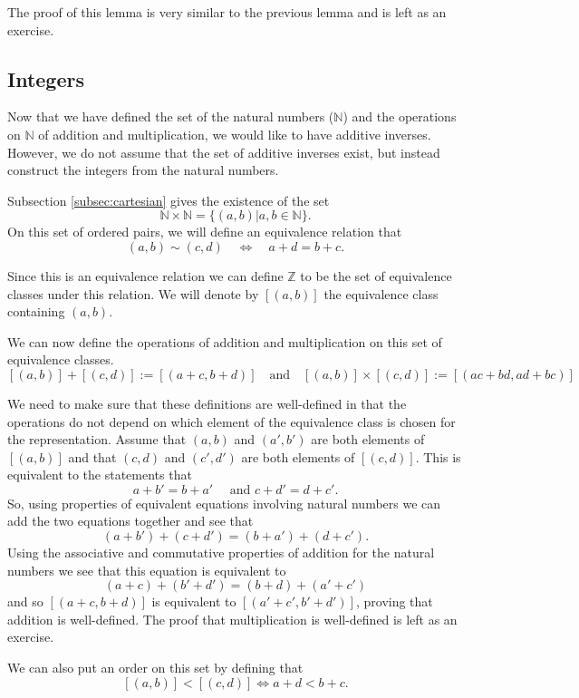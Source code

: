 \documentclass[
]{book}
\theoremstyle{definition}
\theoremstyle{definition}
\theoremstyle{definition}
\theoremstyle{remark}
\begin{document}
The proof of this lemma is very similar to the previous lemma and is left as an exercise.

\hypertarget{integers}{%
\subsection{Integers}\label{integers}}

Now that we have defined the set of the natural numbers (\(\mathbb{N}\)) and the operations on \(\mathbb{N}\) of addition and multiplication, we would like to have additive inverses. However, we do not assume that the set of additive inverses exist, but instead construct the integers from the natural numbers.

Subsection \ref{subsec:cartesian} gives the existence of the set \[\mathbb{N}\times \mathbb{N} = \{ (a,b)  \vert a,b \in \mathbb{N}\}.\] On this set of ordered pairs, we will define an equivalence relation that
\[(a,b)\sim (c,d) \quad \Leftrightarrow \quad  a+d=b+c.\]

Since this is an equivalence relation we can define \(\mathbb{Z}\) to be the set of equivalence classes under this relation. We will denote by \([(a,b)]\) the equivalence class containing \((a,b)\).

We can now define the operations of addition and multiplication on this set of equivalence classes.
\[[(a,b)]+[(c,d)]:= [(a+c,b+d)] \quad \mbox{and} \quad [(a,b)]\times [(c,d)] := [(ac+bd,ad+bc)]\]

We need to make sure that these definitions are well-defined in that the operations do not depend on which element of the equivalence class is chosen for the representation. Assume that \((a,b)\) and \((a',b')\) are both elements of \([(a,b)]\) and that \((c,d)\) and \((c',d')\) are both elements of \([(c,d)]\). This is equivalent to the statements that \[a+b'=b+a' \quad \mbox{ and } c+d'=d+c'.\] So, using properties of equivalent equations involving natural numbers we can add the two equations together and see that \[(a+b') + (c+d') = (b+a')+(d+c').\] Using the associative and commutative properties of addition for the natural numbers we see that this equation is equivalent to \[(a+c) + (b'+d') = (b+d) + (a'+c')\] and so \([(a+c,b+d)]\) is equivalent to \([(a'+c',b'+d')]\), proving that addition is well-defined. The proof that multiplication is well-defined is left as an exercise.

We can also put an order on this set by defining that \[[(a,b)] < [(c,d)] \Leftrightarrow a+d<b+c.\]
\end{document}
